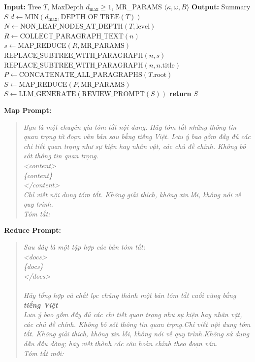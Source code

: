 \documentclass[11pt]{article}
\begin{document}
 
\begin{algorithm}
\caption{Hierarchical Map–Reduce}
\label{alg:hierarchical}
\begin{algorithmic}[1]
\State \textbf{Input:} Tree $T$, MaxDepth $d_{\text{max}} \ge 1$, MR\_PARAMS $\langle\kappa, \omega, B\rangle$
\State \textbf{Output:} Summary $S$
\Statex {}
\State $d \gets \text{MIN}(d_{\text{max}}, \text{DEPTH\_OF\_TREE}(T))$
    \State $N \gets \text{NON\_LEAF\_NODES\_AT\_DEPTH}(T, \text{level})$ 
        \State $R \gets \text{COLLECT\_PARAGRAPH\_TEXT}(n)$ 
            \State $s \gets \text{MAP\_REDUCE}(R, \text{MR\_PARAMS})$ 
            \State $\text{REPLACE\_SUBTREE\_WITH\_PARAGRAPH}(n, s)$
        \Else
            \State $\text{REPLACE\_SUBTREE\_WITH\_PARAGRAPH}(n, n.\text{title})$
        \EndIf
    \EndFor
\EndFor
\Statex {}
\State $P \gets \text{CONCATENATE\_ALL\_PARAGRAPHS}(T.\text{root})$
\State $S \gets \text{MAP\_REDUCE}(P, \text{MR\_PARAMS})$
\State $S \gets \text{LLM\_GENERATE}(\text{REVIEW\_PROMPT}(S))$ 
\State \textbf{return} $S$
\end{algorithmic}
\end{algorithm}

\textbf{Map Prompt:}
\begin{quote}
\textit{Bạn là một chuyên gia tóm tắt nội dung. Hãy tóm tắt những thông tin quan trọng từ đoạn văn bản sau bằng tiếng Việt. Lưu ý bao gồm đầy đủ các chi tiết quan trọng như sự kiện hay nhân vật, các chủ đề chính. Không bỏ sót thông tin quan trọng.\\
<content>\\
\{content\}\\
</content>\\
Chỉ viết nội dung tóm tắt. Không giải thích, không xin lỗi, không nói về quy trình.\\
Tóm tắt:}
\end{quote}

\textbf{Reduce Prompt:}
\begin{quote}
\textit{Sau đây là một tập hợp các bản tóm tắt:\\
<docs>\\
\{docs\}\\
</docs>\\
\\
Hãy tổng hợp và chắt lọc chúng thành một bản tóm tắt cuối cùng bằng \textbf{tiếng Việt}\\
Lưu ý bao gồm đầy đủ các chi tiết quan trọng như sự kiện hay nhân vật, các chủ đề chính. Không bỏ sót thông tin quan trọng.Chỉ viết nội dung tóm tắt. Không giải thích, không xin lỗi, không nói về quy trình.Không sử dụng dấu đầu dòng; hãy viết thành các câu hoàn chỉnh theo đoạn văn.\\
Tóm tắt mới:}
\end{quote}
\end{document}
